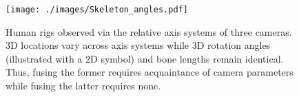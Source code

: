 \begin{figure}[t]
\centering
\texttt{[image: ./images/Skeleton\_angles.pdf]}
\caption{Human rigs observed via the relative axis systems of three cameras. 3D locations vary across axis systems while 3D rotation angles (illustrated with a 2D symbol) and bone lengths remain identical. Thus, fusing the former requires acquaintance of camera parameters while fusing the latter requires none. }
\label{fig:skeleton_angles}
\end{figure}